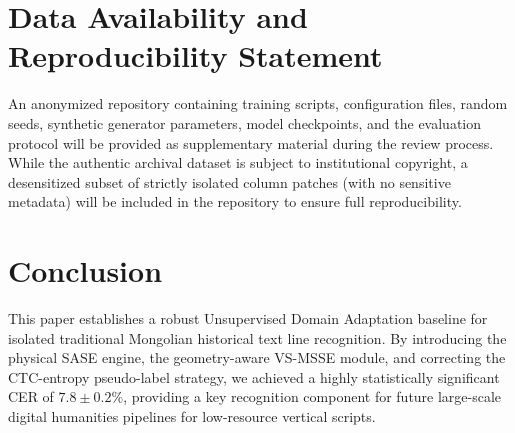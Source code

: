 \documentclass[11pt]{article}
\begin{document}
\section{Data Availability and Reproducibility Statement}
An anonymized repository containing training scripts, configuration files, random seeds, synthetic generator parameters, model checkpoints, and the evaluation protocol will be provided as supplementary material during the review process. While the authentic archival dataset is subject to institutional copyright, a desensitized subset of strictly isolated column patches (with no sensitive metadata) will be included in the repository to ensure full reproducibility.

\section{Conclusion}
This paper establishes a robust Unsupervised Domain Adaptation baseline for isolated traditional Mongolian historical text line recognition. By introducing the physical SASE engine, the geometry-aware VS-MSSE module, and correcting the CTC-entropy pseudo-label strategy, we achieved a highly statistically significant CER of $7.8 \pm 0.2\%$, providing a key recognition component for future large-scale digital humanities pipelines for low-resource vertical scripts.
\end{document}
